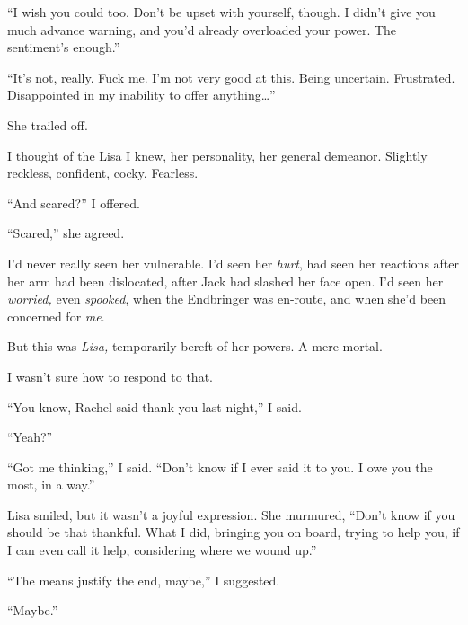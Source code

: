 ``I wish you could too.  Don't be upset with yourself, though.  I didn't give you much advance warning, and you'd already overloaded your power.  The sentiment's enough.''



``It's not, really.  Fuck me.  I'm not very good at this.  Being uncertain.  Frustrated.  Disappointed in my inability to offer anything\ldots''



She trailed off.



I thought of the Lisa I knew, her personality, her general demeanor.  Slightly reckless, confident, cocky.  Fearless.



``And scared?'' I offered.



``Scared,'' she agreed.



I'd never really seen her vulnerable.  I'd seen her \emph{hurt}, had seen her reactions after her arm had been dislocated, after Jack had slashed her face open.  I'd seen her \emph{worried, }even \emph{spooked}, when the Endbringer was en-route, and when she'd been concerned for \emph{me}.



But this was \emph{Lisa, }temporarily bereft of her powers.  A mere mortal.



I wasn't sure how to respond to that.



``You know, Rachel said thank you last night,'' I said.



``Yeah?''



``Got me thinking,'' I said.  ``Don't know if I ever said it to you.  I owe you the most, in a way.''



Lisa smiled, but it wasn't a joyful expression.  She murmured, ``Don't know if you should be that thankful.  What I did, bringing you on board, trying to help you, if I can even call it help, considering where we wound up.''



``The means justify the end, maybe,'' I suggested.



``Maybe.''



